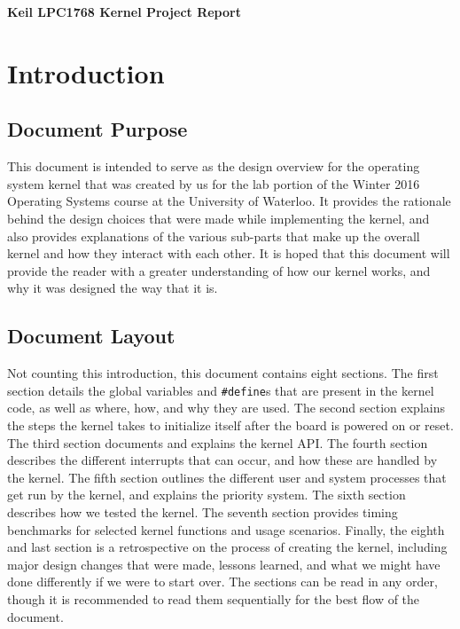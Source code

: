 \documentclass[12pt]{article}
\renewcommand{\thepage}{\roman{page}}%
\begin{document}
\begin{titlepage}
\center\Huge{\textbf{Keil LPC1768 Kernel Project Report}}
{
	\vfill
{}
}
\end{titlepage}
\newpage

\tableofcontents
\setcounter{page}{2}
\newpage

\renewcommand{\thepage}{\arabic{page}}%
\setcounter{page}{3}
\section{Introduction}\label{intro}
\subsection{Document Purpose}
This document is intended to serve as the design overview for the operating system kernel that was created by us for the lab portion of the Winter 2016 Operating Systems course at the University of Waterloo. It provides the rationale behind the design choices that were made while implementing the kernel, and also provides explanations of the various sub-parts that make up the overall kernel and how they interact with each other. It is hoped that this document will provide the reader with a greater understanding of how our kernel works, and why it was designed the way that it is.

\subsection{Document Layout}
Not counting this introduction, this document contains eight sections. The first section details the global variables and \verb|#define|s that are present in the kernel code, as well as where, how, and why they are used. The second section explains the steps the kernel takes to initialize itself after the board is powered on or reset. The third section documents and explains the kernel API. The fourth section describes the different interrupts that can occur, and how these are handled by the kernel. The fifth section outlines the different user and system processes that get run by the kernel, and explains the priority system. The sixth section describes how we tested the kernel. The seventh section provides timing benchmarks for selected kernel functions and usage scenarios. Finally, the eighth and last section is a retrospective on the process of creating the kernel, including major design changes that were made, lessons learned, and what we might have done differently if we were to start over. The sections can be read in any order, though it is recommended to read them sequentially for the best flow of the document.
\newpage
\end{document}
